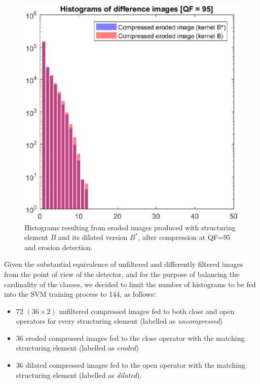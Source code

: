 \documentclass[review]{elsarticle}
\begin{document}
\begin{figure}[!ht]
	\centering
	\includegraphics[scale=0.55]{hist_ero_ero_albero.eps}
	\caption{Histograms resulting from eroded images produced with structuring element $B$ and its dilated version $B^*$, after compression at QF=95 and erosion detection.}
	\label{fig:hist_ero_ero_albero}
\end{figure}

Given the substantial equivalence of unfiltered and differently filtered images from the point of view of the detector, and for the purpose of balancing the cardinality of the classes, we decided to limit the number of histograms to be fed into the SVM training process to 144, as follows:

\begin{itemize}
	\item 72 $(36 \times 2)$ unfiltered compressed images fed to both close and open operators for every structuring element (labelled as \textit{uncompressed})
	\item 36 eroded compressed images fed to the close operator with the matching structuring element (labelled as \textit{eroded})
	\item 36 dilated compressed images fed to the open operator with the matching structuring element (labelled as \textit{dilated}).
\end{itemize}
\end{document}
